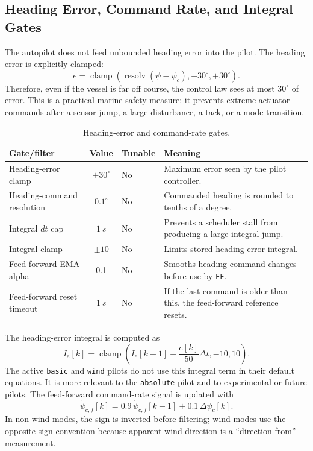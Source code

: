 \documentclass[11pt,twocolumn]{article}
\begin{document}
\subsection{Heading Error, Command Rate, and Integral Gates}
The autopilot does not feed unbounded heading error into the pilot.  The
heading error is explicitly clamped:
\[
e
=
\operatorname{clamp}
\left(
\operatorname{resolv}(\psi-\psi_c),
-30^\circ,
+30^\circ
\right).
\]
Therefore, even if the vessel is far off course, the control law sees at
most \(30^\circ\) of error.  This is a practical marine safety measure:
it prevents extreme actuator commands after a sensor jump, a large
disturbance, a tack, or a mode transition.
\begin{table}[h]
\centering
\caption{Heading-error and command-rate gates.}
\label{tab:pypilot-heading-gates}
\begin{tabularx}{\columnwidth}{Z{0.26\columnwidth}cZ{0.14\columnwidth}Y}
\toprule
Gate/filter & Value & Tunable & Meaning \\
\midrule
Heading-error clamp &
\(\pm 30^\circ\) &
No &
Maximum error seen by the pilot controller. \\
Heading-command resolution &
\(\num{0.1}^\circ\) &
No &
Commanded heading is rounded to tenths of a degree. \\
Integral \(dt\) cap &
\(\SI{1}{s}\) &
No &
Prevents a scheduler stall from producing a large integral jump. \\
Integral clamp &
\(\pm 10\) &
No &
Limits stored heading-error integral. \\
Feed-forward EMA alpha &
\num{0.1} &
No &
Smooths heading-command changes before use by \texttt{FF}. \\
Feed-forward reset timeout &
\(\SI{1}{s}\) &
No &
If the last command is older than this, the feed-forward reference resets. \\
\bottomrule
\end{tabularx}
\end{table}
The heading-error integral is computed as
\[
I_e[k]
=
\operatorname{clamp}
\left(
I_e[k-1]
+
\frac{e[k]}{50}\Delta t,
-10,
10
\right).
\]
The active \texttt{basic} and \texttt{wind} pilots do not use this
integral term in their default equations.  It is more relevant to the
\texttt{absolute} pilot and to experimental or future pilots.
The feed-forward command-rate signal is updated with
\[
\dot{\psi}_{c,f}[k]
=
0.9\,\dot{\psi}_{c,f}[k-1]
+
0.1\,\Delta\psi_c[k].
\]
In non-wind modes, the sign is inverted before filtering; wind modes use
the opposite sign convention because apparent wind direction is a
``direction from'' measurement.
\end{document}
